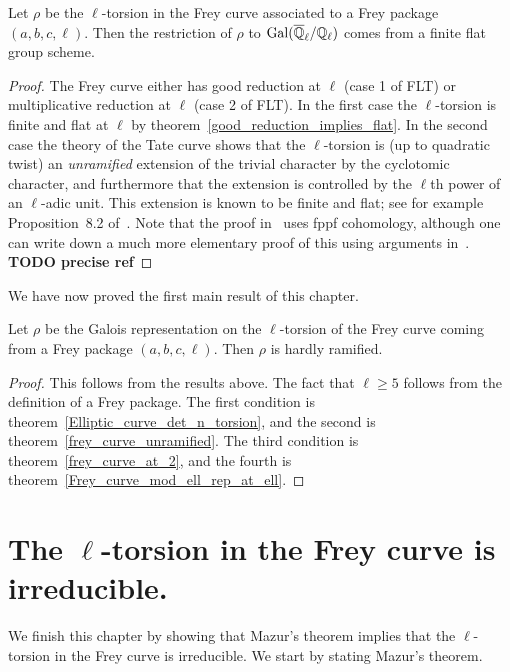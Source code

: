 \begin{theorem}\label{Frey_curve_mod_ell_rep_at_ell} Let $\rho$ be the $\ell$-torsion in the
  Frey curve associated to a Frey package $(a,b,c,\ell)$. Then the restriction of $\rho$ to $\operatorname{Gal}(\overline{\mathbb{Q}}_\ell/\mathbb{Q}_\ell)$ comes from a finite flat group scheme.
\end{theorem}
\begin{proof} The Frey curve either has good reduction at $\ell$ (case 1 of FLT) or multiplicative 
  reduction at $\ell$ (case 2 of FLT). In the first case the $\ell$-torsion is finite and flat
  at $\ell$ by theorem~\ref{good_reduction_implies_flat}. In the second case the theory of the Tate
   curve shows that the $\ell$-torsion is (up to quadratic twist) an \emph{unramified} extension of
    the trivial character by the cyclotomic character, and furthermore that the extension is 
    controlled
  by the $\ell$th power of an $\ell$-adic unit. This extension is known to be finite and flat;
  see for example Proposition~8.2 of~\cite{edix}. Note that the proof in~\cite{edix} uses
  fppf cohomology, although one can write down a much more elementary proof of this using
  arguments in~\cite{katz-mazur}. {\bf TODO precise ref}
\end{proof}

We have now proved the first main result of this chapter.

\begin{theorem}\label{frey_curve_hardly_ramified} Let $\rho$ be the Galois representation on the 
  $\ell$-torsion of the Frey curve coming from a Frey package $(a,b,c,\ell)$. Then $\rho$ is hardly 
  ramified.
\end{theorem}
\begin{proof}
  This follows from the results above. The fact that $\ell\geq 5$ follows from the definition of
  a Frey package. The first condition is theorem~\ref{Elliptic_curve_det_n_torsion},
  and the second is theorem~\ref{frey_curve_unramified}. The third condition is
  theorem~\ref{frey_curve_at_2}, and the fourth is theorem~\ref{Frey_curve_mod_ell_rep_at_ell}.
\end{proof}

\section[The l-torsion in the Frey curve is irreducible.]{The $\ell$-torsion in the Frey curve is irreducible.}

We finish this chapter by showing that Mazur's theorem implies that the $\ell$-torsion in the Frey
 curve is irreducible. We start by stating Mazur's theorem.

